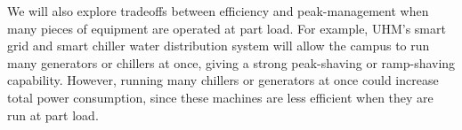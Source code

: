 We will also explore tradeoffs between efficiency and peak-management when
many pieces of equipment are operated at part load. For example, UHM's
smart grid and smart chiller water distribution system will allow the campus to
run many generators or chillers at once, giving a strong peak-shaving or
ramp-shaving capability. However, running many chillers or generators at once 
could increase total power consumption, since these machines are less efficient
when they are run at part load.


